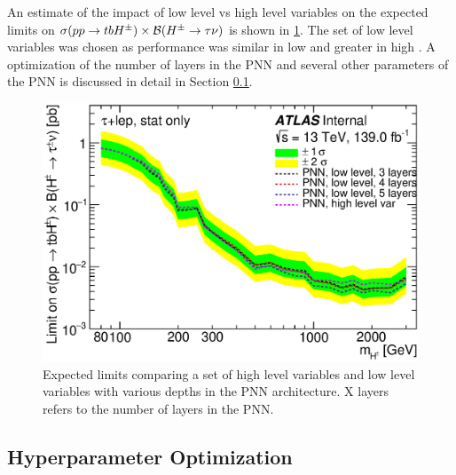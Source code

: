       An estimate of the impact of low level vs high level variables on the expected limits on $\sigma(pp\to tbH^{\pm})\times \mathrm{\cal{B}}(H^{\pm} \to \tau \nu)$ is shown in \ref{fig:variable-comparison-limits}. The set of low level variables was chosen as performance was similar in low \mHpm and greater in high \mHpm. A optimization of the number of layers in the \gls{PNN} and several other parameters of the \gls{PNN} is discussed in detail in Section \ref{ssec:hpo}.
			\begin{figure}	
				\begin{center}
					\includegraphics[width=.75\textwidth,keepaspectratio=true]{chapters/chapter6_HPlus/images/taulep_limits_PNN_low_lv_vs_high_lv.eps}
				\end{center}
				\caption{Expected limits comparing a set of high level variables and low level variables with various depths in the \gls{PNN} architecture. X layers refers to the number of layers in the \gls{PNN}. }
				\label{fig:variable-comparison-limits}
			\end{figure}	

		\subsection{Hyperparameter Optimization}\label{ssec:hpo}

